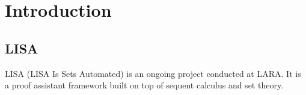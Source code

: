 \section{Introduction}
\label{sec:introduction}

\subsection{LISA}

LISA (LISA Is Sets Automated) is an ongoing project conducted at LARA. It is a proof assistant framework built on top of sequent calculus and set theory. \cite{Guilloud2022-2}
